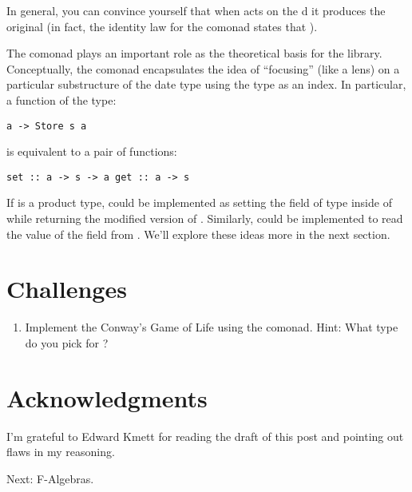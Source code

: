 In general, you can convince yourself that when  acts on
the d  it produces the original
 (in fact, the identity law for the comonad states that
).

The  comonad plays an important role as the theoretical
basis for the  library. Conceptually, the
 comonad encapsulates the idea of ``focusing'' (like
a lens) on a particular substructure of the date type  using
the type  as an index. In particular, a function of the type:

\begin{verbatim}
a -> Store s a
\end{verbatim}

is equivalent to a pair of functions:

\begin{verbatim}
set :: a -> s -> a get :: a -> s
\end{verbatim}

If  is a product type,  could be implemented as
setting the field of type  inside of  while
returning the modified version of . Similarly, 
could be implemented to read the value of the  field from
. We'll explore these ideas more in the next section.

\section{Challenges}\label{challenges}

\begin{enumerate}
\tightlist
\item
  Implement the Conway's Game of Life using the  comonad.
  Hint: What type do you pick for ?
\end{enumerate}

\section{Acknowledgments}\label{acknowledgments}

I'm grateful to Edward Kmett for reading the draft of this post and
pointing out flaws in my reasoning.

Next: F-Algebras.
